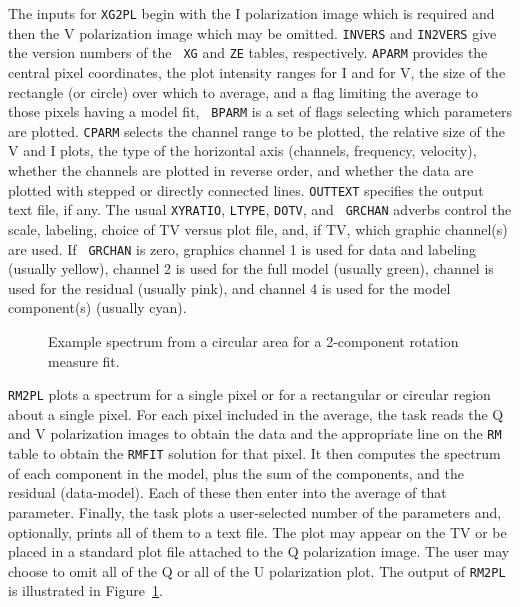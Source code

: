 \documentclass[twoside]{article}
\newcommand{\Hi}[1]{\textcolor{hicol}{#1}}
\newcommand{\putfig}[1]{\texttt{[image: \#1.eps]}}
\begin{document}
The inputs for {\tt XG2PL} begin with the I polarization image which
is required and then the V polarization image which may be omitted.
{\tt INVERS} and {\tt IN2VERS} give the version numbers of the {\tt
  XG} and {\tt ZE} tables, respectively.  {\tt APARM} provides the
central pixel coordinates, the plot intensity ranges for I and for V,
the size of the rectangle (or circle) over which to average, and a
flag limiting the average to those pixels having a model fit,  {\tt
  BPARM} is a set of flags selecting which parameters are plotted.
{\tt CPARM} selects the channel range to be plotted, the relative size
of the V and I plots, the type of the horizontal axis (channels,
frequency, velocity), whether the channels are plotted in reverse
order, and whether the data are plotted with stepped or directly
connected lines.  {\tt OUTTEXT} specifies the output text file, if
any.  The usual {\tt XYRATIO}, {\tt LTYPE}, {\tt DOTV}, and {\tt
  GRCHAN} adverbs control the scale, labeling, choice of TV versus
plot file, and, if TV, which graphic channel(s) are used.  If {\tt
  GRCHAN} is zero, graphics channel 1 is used for data and labeling
(usually yellow), channel 2 is used for the full model (usually
green), channel is used for the residual (usually pink), and channel 4
is used for the model component(s) (usually cyan).

\begin{figure}
\begin{center}
\resizebox{6.0in}{!}{\putfig{RM2PL}}
\caption{\Hi{Example spectrum from a circular area for a 2-component
  rotation measure fit.}}
\label{fig:RM2PL}
\end{center}
\end{figure}

{\tt RM2PL} plots a spectrum for a single pixel or for a rectangular
or circular region about a single pixel.  For each pixel included in
the average, the task reads the Q and V polarization images to obtain
the data and the appropriate line on the {\tt RM} table to obtain the
{\tt RMFIT} solution for that pixel.  It then computes the spectrum of
each component in the model, plus the sum of the components, and the
residual (data-model).  Each of these then enter into the average of
that parameter.  Finally, the task plots a user-selected number of the
parameters and, optionally, prints all of them to a text file.  The
plot may appear on the TV or be placed in a standard plot file
attached to the Q polarization image.  The user may choose to omit all
of the Q or all of the U polarization plot.  The output of {\tt RM2PL}
is illustrated in Figure~\ref{fig:RM2PL}.
\end{document}
